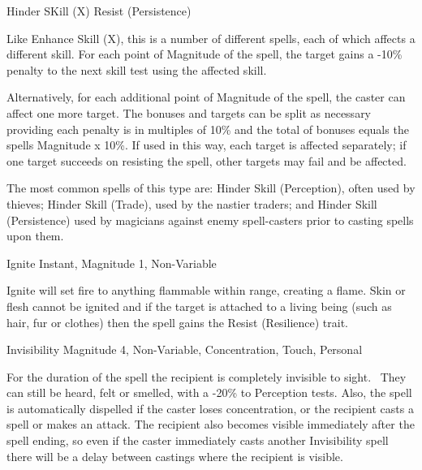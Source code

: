 \begin{rpg-spell}
{Hinder SKill (X)}
{Resist (Persistence)}

Like Enhance Skill (X), this is a number of different spells, each of which affects a different skill. For each point of Magnitude of the spell, the target gains a -10\% penalty to the next skill test using the affected skill.

Alternatively, for each additional point of Magnitude of the spell, the caster can affect one more target.  The bonuses and targets can be split as necessary providing each penalty is in multiples of 10\% and the total of bonuses equals the spells Magnitude x 10\%. If used in this way, each target is affected separately; if one target succeeds on resisting the spell, other targets may fail and be affected.

The most common spells of this type are: Hinder Skill (Perception), often used by thieves; Hinder Skill (Trade), used by the nastier traders; and Hinder Skill (Persistence) used by magicians against enemy spell-casters prior to casting spells upon them.
\end{rpg-spell}


\begin{rpg-spell}
{Ignite}
{Instant, Magnitude 1, Non-Variable}

Ignite will set fire to anything flammable within range, creating a flame. Skin or flesh cannot be ignited and if the target is attached to a living being (such as hair, fur or clothes) then the spell gains the Resist (Resilience) trait. 
\end{rpg-spell}


\begin{rpg-spell}
{Invisibility}
{Magnitude 4, Non-Variable, Concentration, Touch, Personal}

For the duration of the spell the recipient is completely invisible to sight.  They can still be heard, felt or smelled, with a -20\% to Perception tests. Also, the spell is automatically dispelled if the caster loses concentration, or the recipient casts a spell or makes an attack. The recipient also becomes visible immediately after the spell ending, so even if the caster immediately casts another Invisibility spell there will be a delay between castings where the recipient is visible.
\end{rpg-spell}


